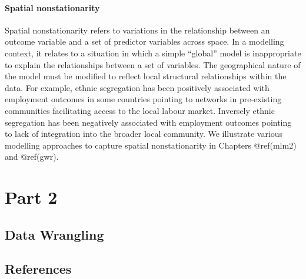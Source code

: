 \documentclass[
  letterpaper,
  krantz2]{style/krantz}
\begin{document}
\hypertarget{spatial-nonstationarity}{%
\subsection{Spatial nonstationarity}\label{spatial-nonstationarity}}

Spatial nonstationarity refers to variations in the relationship between
an outcome variable and a set of predictor variables across space. In a
modelling context, it relates to a situation in which a simple
``global'' model is inappropriate to explain the relationships between a
set of variables. The geographical nature of the model must be modified
to reflect local structural relationships within the data. For example,
ethnic segregation has been positively associated with employment
outcomes in some countries pointing to networks in pre-existing
communities facilitating access to the local labour market. Inversely
ethnic segregation has been negatively associated with employment
outcomes pointing to lack of integration into the broader local
community. We illustrate various modelling approaches to capture spatial
nonstationarity in Chapters @ref(mlm2) and @ref(gwr).

\part{Part 2}

\hypertarget{data-wrangling}{%
\chapter{Data Wrangling}\label{data-wrangling}}


\hypertarget{references}{%
\chapter*{References}\label{references}}

\end{document}
